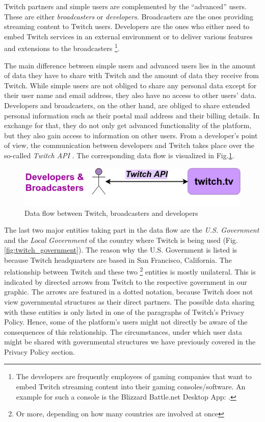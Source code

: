 Twitch partners and simple users are complemented by the ``advanced'' users. These are either \textit{broadcasters} or \textit{developers}. Broadcasters are the ones providing streaming content to Twitch users. Developers are the ones who either need to embed Twitch services in an external environment or to deliver various features and extensions to the broadcasters \footnote{The developers are frequently employees of gaming companies that want to embed Twitch streaming content into their gaming consoles/software. An example for such a console is the Blizzard Battle.net Desktop App: \cite{blizzard-desktop-app}.}. 

The main difference between simple users and advanced users lies in the amount of data they have to share with Twitch and the amount of data they receive from Twitch. While simple users are not obliged to share any personal data except for their user name and email address, they also have no access to other users' data. Developers and broadcasters, on the other hand, are obliged to share extended personal information such as their postal mail address and their billing details. In exchange for that, they do not only get advanced functionality of the platform, but they also gain access to information on other users. From a developer's point of view, the communication between developers and Twitch takes place over the so-called \textit{Twitch API} \cite{twitch-developers-platform, twitch-developers-guide}. The corresponding data flow is visualized in Fig.\ref{fig:twitch_broadcasters_developers}. 

\begin{figure}[h!]
	\centering
	\includegraphics[width=0.6\linewidth]{sections/figures/twitch_broadcasters_developers}
	\caption{Data flow between Twitch, broadcasters and developers}
	\label{fig:twitch_broadcasters_developers}
\end{figure}

The last two major entities taking part in the data flow are the \textit{U.S. Government} and the \textit{Local Government} of the country where Twitch is being used (Fig.\ref{fig:twitch_government}). The reason why the U.S. Government is listed is because Twitch headquarters are based in San Francisco, California. 
The relationship between Twitch and these two \footnote{Or more, depending on how many countries are involved at once} entities is mostly unilateral. This is indicated by directed arrows from Twitch to the respective government in our graphic. The arrows are featured in a dotted notation, because Twitch does not view governmental structures as their direct partners. The possible data sharing with these entities is only listed in one of the paragraphs of Twitch's Privacy Policy. Hence, some of the platform's users might not directly be aware of the consequences of this relationship. The circumstances, under which user data might be shared with governmental structures we have previously covered in the Privacy Policy section. 

